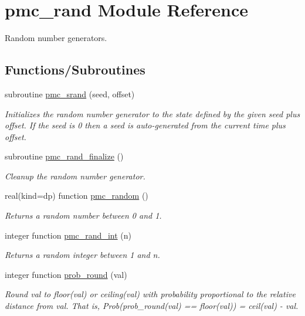 \hypertarget{namespacepmc__rand}{}\section{pmc\+\_\+rand Module Reference}
\label{namespacepmc__rand}


Random number generators.  


\subsection*{Functions/\+Subroutines}
\begin{DoxyCompactItemize}
\item 
subroutine \mbox{\hyperlink{namespacepmc__rand_a40da4da741045a9a9ee1ac71aaa17733}{pmc\+\_\+srand}} (seed, offset)
\begin{DoxyCompactList}\small\item\em Initializes the random number generator to the state defined by the given seed plus offset. If the seed is 0 then a seed is auto-\/generated from the current time plus offset. \end{DoxyCompactList}\item 
subroutine \mbox{\hyperlink{namespacepmc__rand_a48ab8c38095e258be9faafc7bd59ee35}{pmc\+\_\+rand\+\_\+finalize}} ()
\begin{DoxyCompactList}\small\item\em Cleanup the random number generator. \end{DoxyCompactList}\item 
real(kind=dp) function \mbox{\hyperlink{namespacepmc__rand_ac30aa8df3ca962ead17d9adcaceb7263}{pmc\+\_\+random}} ()
\begin{DoxyCompactList}\small\item\em Returns a random number between 0 and 1. \end{DoxyCompactList}\item 
integer function \mbox{\hyperlink{namespacepmc__rand_afe2e7274c4b89e11909e08b1b1fd0e60}{pmc\+\_\+rand\+\_\+int}} (n)
\begin{DoxyCompactList}\small\item\em Returns a random integer between 1 and n. \end{DoxyCompactList}\item 
integer function \mbox{\hyperlink{namespacepmc__rand_aa92bb8693f9b8ef18c9e4ec820ada63b}{prob\+\_\+round}} (val)
\begin{DoxyCompactList}\small\item\em Round val to {\ttfamily floor(val)} or {\ttfamily ceiling(val)} with probability proportional to the relative distance from {\ttfamily val}. That is, Prob(prob\+\_\+round(val) == floor(val)) = ceil(val) -\/ val. \end{DoxyCompactList}\item 

\end{DoxyCompactItemize}

